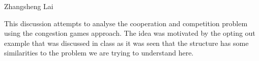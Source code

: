 \documentclass[a4paper,10pt]{article}
\theoremstyle{definition}
\begin{document}
\begin{flushright}
Zhangsheng Lai
\end{flushright}

This discussion attempts to analyse the cooperation and competition problem using the congestion games approach. The idea was motivated by the opting out example that was discussed in class as it was seen that the structure has some similarities to the problem we are trying to understand here.

\newdimen\R
\R=2cm
\begin{figure}[h]
\centering
{}
\end{figure}

%
\end{document}
